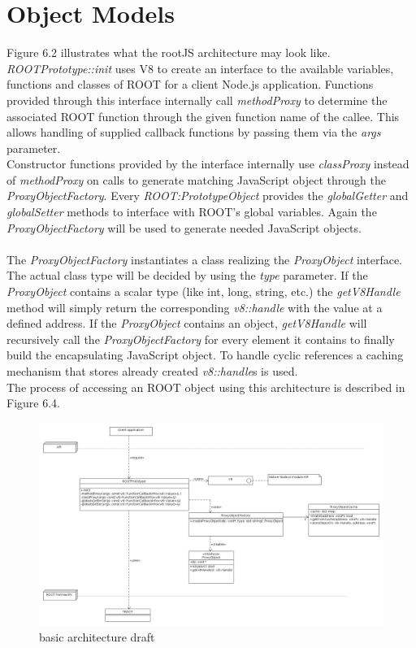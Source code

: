 \pagebreak[4]

\section{Object Models}
Figure 6.2 illustrates what the rootJS architecture may look like.\\
\textit{ROOTPrototype::init} uses V8 to create an interface to the available variables, functions and classes of ROOT for a client Node.js application.
Functions provided through this interface internally call \textit{methodProxy} to determine the associated ROOT function through the given function name of the callee. This allows handling of supplied callback functions by passing them via the \textit{args} parameter.\\
Constructor functions provided by the interface internally use \textit{classProxy} instead of \textit{methodProxy} on calls to generate matching JavaScript object through the \textit{ProxyObjectFactory}.
Every \textit{ROOT:PrototypeObject} provides the \textit{globalGetter} and \textit{globalSetter} methods to interface with ROOT's global variables. Again the \textit{ProxyObjectFactory} will be used to generate needed JavaScript objects.
\\ \\
The \textit{ProxyObjectFactory} instantiates a class realizing the \textit{ProxyObject} interface. The actual class type will be decided by using the \textit{type} parameter.
If the \textit{ProxyObject} contains a scalar type (like int, long, string, etc.) the \textit{getV8Handle} method will simply return the corresponding \textit{v8::handle} with the value at a defined address.
If the \textit{ProxyObject} contains an object, \textit{getV8Handle} will recursively call the \textit{ProxyObjectFactory} for every element it contains to finally build the encapsulating JavaScript object.
To handle cyclic references a caching mechanism that stores already created \textit{v8::handle}s is used.\\
The process of accessing an ROOT object using this architecture is described in Figure 6.4.

\begin{figure}[htb]
	\centering
	\includegraphics[width=18cm]{./latex/resources/architecture.png}
	\caption{basic architecture draft}
\end{figure}

